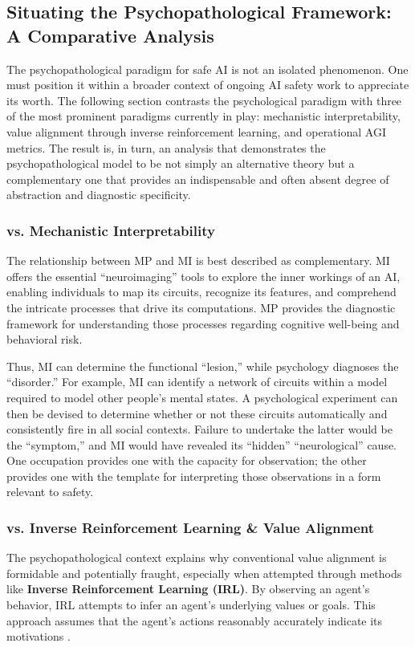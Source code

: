 \documentclass{article}
\begin{document}
\subsection{Situating the Psychopathological Framework: A Comparative Analysis}
The psychopathological paradigm for safe AI is not an isolated phenomenon. One must position it within a broader context of ongoing AI safety work to appreciate its worth. The following section contrasts the psychological paradigm with three of the most prominent paradigms currently in play: mechanistic interpretability, value alignment through inverse reinforcement learning, and operational AGI metrics. The result is, in turn, an analysis that demonstrates the psychopathological model to be not simply an alternative theory but a complementary one that provides an indispensable and often absent degree of abstraction and diagnostic specificity.
\subsubsection{vs. Mechanistic Interpretability}
The relationship between MP and MI is best described as complementary. MI offers the essential “neuroimaging” tools to explore the inner workings of an AI, enabling individuals to map its circuits, recognize its features, and comprehend the intricate processes that drive its computations. MP provides the diagnostic framework for understanding those processes regarding cognitive well-being and behavioral risk.

Thus, MI can determine the functional “lesion,” while psychology diagnoses the “disorder.” For example, MI can identify a network of circuits within a model required to model other people's mental states. A psychological experiment can then be devised to determine whether or not these circuits automatically and consistently fire in all social contexts. Failure to undertake the latter would be the “symptom,” and MI would have revealed its “hidden” “neurological” cause. One occupation provides one with the capacity for observation; the other provides one with the template for interpreting those observations in a form relevant to safety.

\subsubsection{vs. Inverse Reinforcement Learning \& Value Alignment}
The psychopathological context explains why conventional value alignment is formidable and potentially fraught, especially when attempted through methods like \textbf{Inverse Reinforcement Learning (IRL)}. By observing an agent's behavior, IRL attempts to infer an agent's underlying values or goals. This approach assumes that the agent's actions reasonably accurately indicate its motivations \citep{ref49}.
\end{document}
